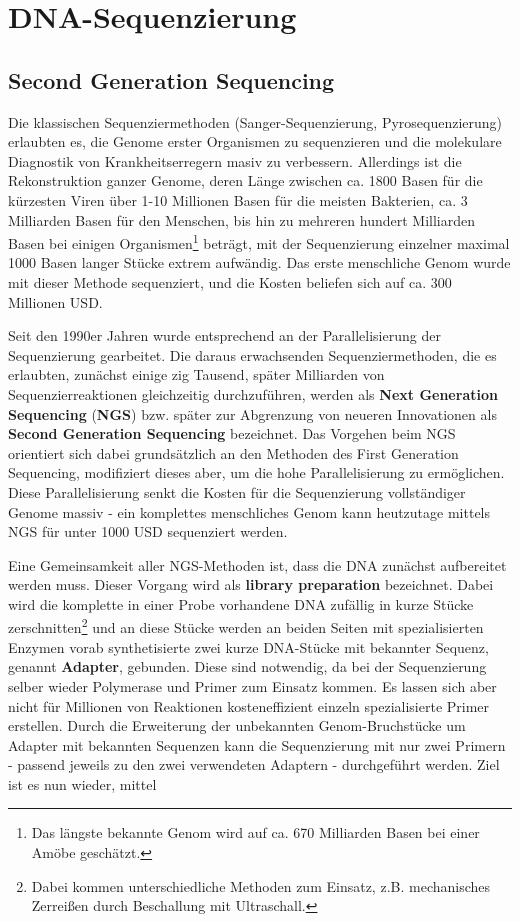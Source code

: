 \section{DNA-Sequenzierung}





\subsection{Second Generation Sequencing}

Die klassischen Sequenziermethoden (Sanger-Sequenzierung, Pyrosequenzierung) erlaubten es, die Genome erster Organismen zu sequenzieren und die molekulare Diagnostik von Krankheitserregern masiv zu verbessern. Allerdings ist die Rekonstruktion ganzer Genome, deren Länge zwischen ca. 1800 Basen für die kürzesten Viren über 1-10 Millionen Basen für die meisten Bakterien, ca. 3 Milliarden Basen für den Menschen, bis hin zu mehreren hundert Milliarden Basen bei einigen Organismen\footnote{Das längste bekannte Genom wird auf ca. 670 Milliarden Basen bei einer Amöbe geschätzt.} beträgt, mit der Sequenzierung einzelner maximal 1000 Basen langer Stücke extrem aufwändig. Das erste menschliche Genom wurde mit dieser Methode sequenziert, und die Kosten beliefen sich auf ca. 300 Millionen USD. 

Seit den 1990er Jahren wurde entsprechend an der Parallelisierung der Sequenzierung gearbeitet. Die daraus erwachsenden Sequenziermethoden, die es erlaubten, zunächst einige zig Tausend, später Milliarden von Sequenzierreaktionen gleichzeitig durchzuführen, werden als \textbf{Next Generation Sequencing} (\textbf{NGS}) bzw. später zur Abgrenzung von neueren Innovationen als \textbf{Second Generation Sequencing} bezeichnet. Das Vorgehen beim NGS orientiert sich dabei grundsätzlich an den Methoden des First Generation Sequencing, modifiziert dieses aber, um die hohe Parallelisierung zu ermöglichen. Diese Parallelisierung senkt die Kosten für die Sequenzierung vollständiger Genome massiv - ein komplettes menschliches Genom kann heutzutage mittels NGS für unter 1000 USD sequenziert werden. 

Eine Gemeinsamkeit aller NGS-Methoden ist, dass die DNA zunächst aufbereitet werden muss. Dieser Vorgang wird als \textbf{library preparation} bezeichnet. Dabei wird die komplette in einer Probe vorhandene DNA zufällig in kurze Stücke zerschnitten\footnote{Dabei kommen unterschiedliche Methoden zum Einsatz, z.B. mechanisches Zerreißen durch Beschallung mit Ultraschall.} und an diese Stücke werden an beiden Seiten mit spezialisierten Enzymen vorab synthetisierte zwei kurze DNA-Stücke mit bekannter Sequenz, genannt \textbf{Adapter}, gebunden. Diese sind notwendig, da bei der Sequenzierung selber wieder Polymerase und Primer zum Einsatz kommen. Es lassen sich aber nicht für Millionen von Reaktionen kosteneffizient einzeln spezialisierte Primer erstellen. Durch die Erweiterung der unbekannten Genom-Bruchstücke um Adapter mit bekannten Sequenzen kann die Sequenzierung mit nur zwei Primern - passend jeweils zu den zwei verwendeten Adaptern - durchgeführt werden. Ziel ist es nun wieder, mittel

